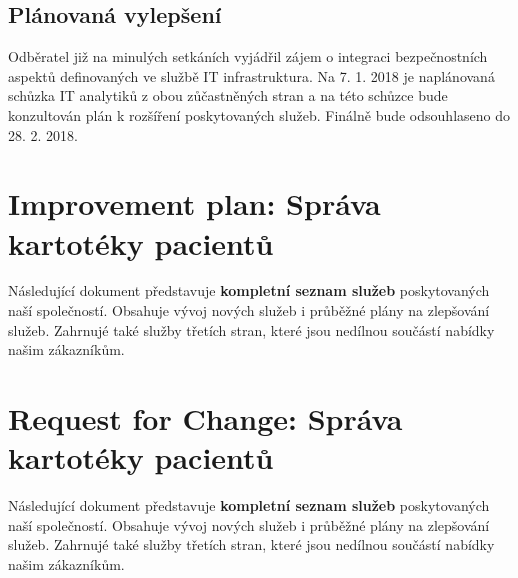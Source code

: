 \documentclass[11pt, a4paper, titlepage]{article}
\begin{document}
	\subsection{Plánovaná vylepšení}

	Odběratel již na minulých setkáních vyjádřil zájem o integraci bezpečnostních aspektů definovaných ve službě IT infrastruktura. Na 7. 1. 2018 je naplánovaná schůzka IT analytiků z obou zůčastněných stran a na této schůzce bude konzultován plán k rozšíření poskytovaných služeb. Finálně bude odsouhlaseno do 28. 2. 2018. 


	\section*{Improvement plan: Správa kartotéky pacientů}

	\vspace{0.5em}

	\noindent\makebox[\linewidth]{\rule{17.5cm}{0.4pt}}

	\vspace{0.5em}

	\noindent Následující dokument představuje \textbf{kompletní seznam služeb} poskytovaných naší společností. Obsahuje vývoj nových služeb i průběžné plány na zlepšování služeb. Zahrnujé také služby třetích stran, které jsou nedílnou součástí nabídky našim zákazníkům. 

	\noindent\makebox[\linewidth]{\rule{17.5cm}{0.4pt}}

	\section*{Request for Change: Správa kartotéky pacientů}

	\vspace{0.5em}

	\noindent\makebox[\linewidth]{\rule{17.5cm}{0.4pt}}

	\vspace{0.5em}

	\noindent Následující dokument představuje \textbf{kompletní seznam služeb} poskytovaných naší společností. Obsahuje vývoj nových služeb i průběžné plány na zlepšování služeb. Zahrnujé také služby třetích stran, které jsou nedílnou součástí nabídky našim zákazníkům. 

	\noindent\makebox[\linewidth]{\rule{17.5cm}{0.4pt}}
\end{document}
